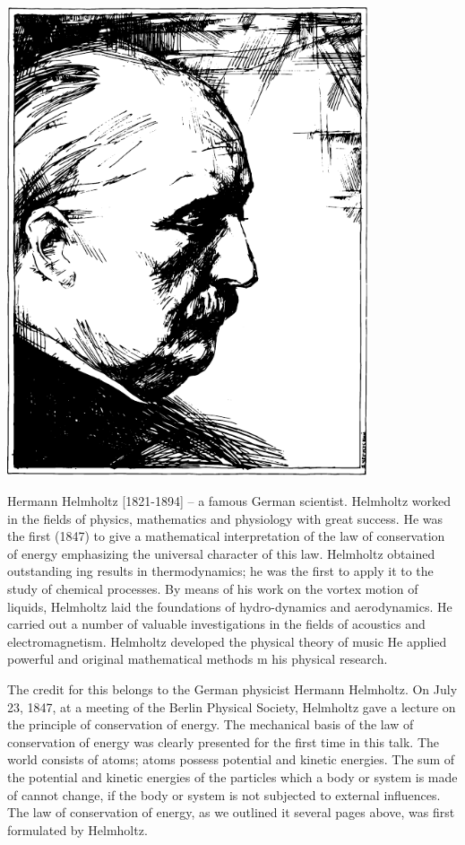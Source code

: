 \begin{center}
\includegraphics[width=0.8\textwidth]{figures/helmholtz.pdf}
\end{center}
{\small \textsf{{Hermann Helmholtz [1821-1894]}} -- \textsf{\footnotesize a famous German scientist. Helm­holtz worked in the fields of physics, mathematics and physiology with great success. He was the first (1847) to give a mathematical interpretation of the law of conservation of energy emphasizing the universal character of this law. Helmholtz obtained outstanding ing results in thermodynamics; he was the first to apply it to the study of chemical processes. By means of his work on the vortex motion of liquids, Helmholtz laid the foundations of hydro-dynamics and aerodynamics. He carried out a number of valuable investigations in the fields of acoustics and electromagnetism. Helmholtz developed the physical theory of music He applied powerful and original mathematical methods m his physical research.}}


The credit for this belongs to the German physicist Hermann Helmholtz. On July 23, 1847, at a meeting of the Berlin Physical Society, Helmholtz gave a lecture on the principle of conservation of energy. The mechanical basis of the law of conservation of energy was clearly presented for the first time in this talk. The world con­sists of atoms; atoms possess potential and kinetic ener­gies. The sum of the potential and kinetic energies of the particles which a body or system is made of cannot change, if the body or system is not subjected to ex­ternal influences. The law of conservation of energy, as we outlined it several pages above, was first formulated by Helmholtz.

